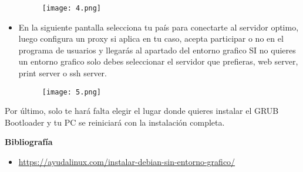 \documentclass[11pt, a4paper]{report}
\begin{document}
\begin{itemize}
  \begin{figure}[!ht] 
    \begin{center}  
      \texttt{[image: 4.png]} 
      \caption{} 
    \end{center} 
  \end{figure}

\item En la siguiente pantalla selecciona tu país para conectarte al servidor
  optimo, luego configura un proxy si aplica en tu caso, acepta participar o no
  en el programa de usuarios y llegarás al apartado del entorno grafico SI no
  quieres un entorno grafico solo debes seleccionar el servidor que prefieras,
  web server, print server o ssh server. 
  
  \begin{figure}[!ht] 
    \begin{center}  
      \texttt{[image: 5.png]} 
      \caption{} 
    \end{center} 
  \end{figure}

\end{itemize}

Por último, solo te hará falta elegir el lugar donde quieres instalar el GRUB Bootloader y tu PC se reiniciará con la instalación completa.

\newpage

\textbf{Bibliografía} \\

\begin{itemize}

\item \url{https://ayudalinux.com/instalar-debian-sin-entorno-grafico/}
\end{itemize}
\end{document}
